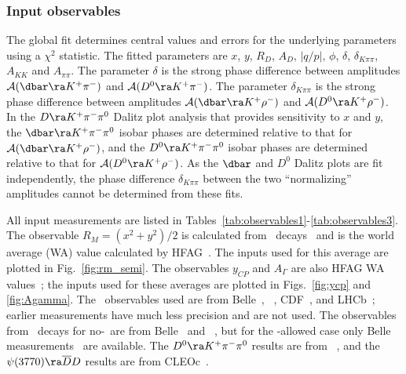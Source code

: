 \subsubsection{Input observables}

The global fit determines central values and errors for
the underlying parameters using a $\chi^2$ statistic.
The fitted parameters are $x$, $y$, $R^{}_D$, $A^{}_D$,
$|q/p|$, $\phi$, $\delta$, $\delta^{}_{K\pi\pi}$,
$A^{}_{KK}$ and $A^{}_{\pi\pi}$.
The parameter $\delta$ is the strong phase difference
between amplitudes ${\cal A}(\dbar\ra K^+\pi^-)$ 
and ${\cal A}(D^0\ra K^+\pi^-)$. 
The parameter $\delta^{}_{K\pi\pi}$ is the strong phase 
difference between amplitudes ${\cal A}(\dbar\ra K^+\rho^-)$ 
and ${\cal A}(D^0\ra K^+\rho^-)$. In the $D\ra K^+\pi^-\pi^0$ 
Dalitz plot analysis that provides sensitivity to $x$ and $y$, 
the $\dbar\ra K^+\pi^-\pi^0$ isobar phases are determined 
relative to that for ${\cal A}(\dbar\ra K^+\rho^-)$, and 
the $D^0\ra K^+\pi^-\pi^0$ isobar phases are determined 
relative to that for ${\cal A}(D^0\ra K^+\rho^-)$. 
As the $\dbar$ and $D^0$ Dalitz plots are fit independently, 
the phase difference $\delta^{}_{K\pi\pi}$ between the
two ``normalizing'' amplitudes cannot be determined
from these fits.

All input measurements are listed in 
Tables~\ref{tab:observables1}-\ref{tab:observables3}. 
The observable $R^{}_M=(x^2+y^2)/2$ is calculated from \dklnu\ 
decays~\cite{Aitala:1996vz,Cawlfield:2005ze,Aubert:2007aa,Bitenc:2008bk}
and is the world average (WA) value calculated by HFAG~\cite{HFAG_charm:webpage}.
The inputs used for this average are plotted in Fig.~\ref{fig:rm_semi}. 
The observables $y^{}_{CP}$ and $A^{}_\Gamma$ are also HFAG WA 
values~\cite{HFAG_charm:webpage}; the inputs used for these 
averages are plotted in Figs.~\ref{fig:ycp} and \ref{fig:Agamma}.
The \dkpi\ observables used are from 
Belle~\cite{Zhang:2006dp,Ko:2014qvu}, 
\babar~\cite{Aubert:2007wf}, 
CDF~\cite{Aaltonen:2013pja}, and
LHCb~\cite{Aaij:2013wda};
earlier measurements have much less precision and are not used.
The observables from \dkspp\ decays for no-\cpv\ are from 
Belle~\cite{Peng:2014oda} and \babar~\cite{delAmoSanchez:2010xz}, 
but for the \cpv-allowed case only Belle 
measurements~\cite{Peng:2014oda} are available. The 
$D^0\ra K^+\pi^-\pi^0$ results are from \babar~\cite{Aubert:2008zh},
and the $\psi(3770)\ra\overline{D}D$ results are from 
CLEOc~\cite{Asner:2012xb}.


